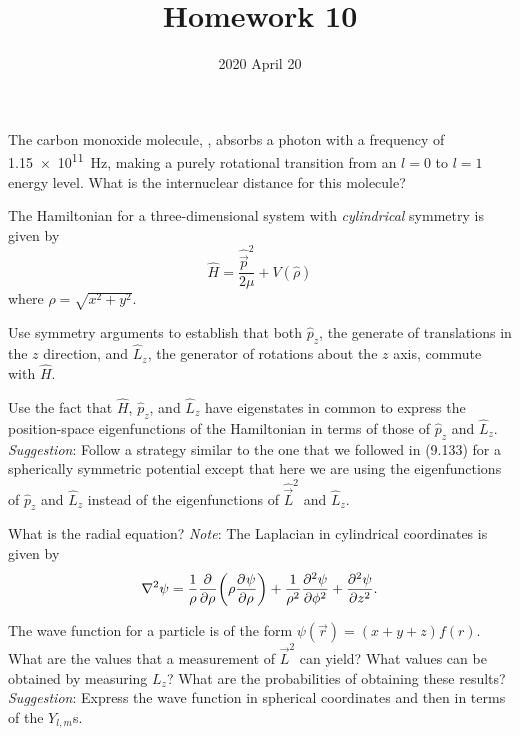 \documentclass {../phys116}
\title {Homework 10}
\author {}
\date {2020 April 20}
\begin{document}
\begin {exercise} 
  The carbon monoxide molecule, , absorbs a photon with a
  frequency of \SI {1.15e11} {\Hz}, making a purely rotational
  transition from an \(l = 0\) to \(l = 1\) energy level.  What is the
  internuclear distance for this molecule?
\end {exercise}

\begin {solution}

\end {solution}

\begin {exercise} 
  The Hamiltonian for a three-dimensional system with \emph
  {cylindrical} symmetry is given by
  \[
    \hat H = \frac {\hat {\vec p}^2} {2 \mu} + V (\hat \rho)
  \]
  where \(\rho = \sqrt {x^2 + y^2}\).

  \begin {problems}
  \item Use symmetry arguments to establish that both \(\hat p_z\),
    the generate of translations in the \(z\) direction, and
    \(\hat L_z\), the generator of rotations about the \(z\) axis,
    commute with \(\hat H\).

  \item Use the fact that \(\hat H\), \(\hat p_z\), and \(\hat L_z\)
    have eigenstates in common to express the position-space
    eigenfunctions of the Hamiltonian in terms of those of
    \(\hat p_z\) and \(\hat L_z\).  \textit {Suggestion}: Follow a
    strategy similar to the one that we followed in (9.133) for a
    spherically symmetric potential except that here we are using the
    eigenfunctions of \(\hat p_z\) and \(\hat L_z\) instead of the
    eigenfunctions of \(\hat {\vec L}^2\) and \(\hat L_z\).

  \item What is the radial equation?  \textit {Note}: The Laplacian in
    cylindrical coordinates is given by
    \[
      \nabla^2 \psi
      = \frac 1 \rho \pdrv {} \rho \prn* {\rho \pdrv \psi \rho}
      + \frac 1 {\rho^2} \pdrv [2] \psi \phi + \pdrv [2] \psi z.
    \]
  \end {problems}
\end {exercise}

\begin {solution}

\end {solution}

\begin {exercise} 
  The wave function for a particle is of the form
  \(\psi (\vec r) = (x + y + z) f (r)\).  What are the values that a
  measurement of \(\vec L^2\) can yield?  What values can be obtained
  by measuring \(L_z\)?  What are the probabilities of obtaining these
  results?  \textit {Suggestion}: Express the wave function in
  spherical coordinates and then in terms of the \(Y_{l, m}\)s.
\end {exercise}
\end{document}
